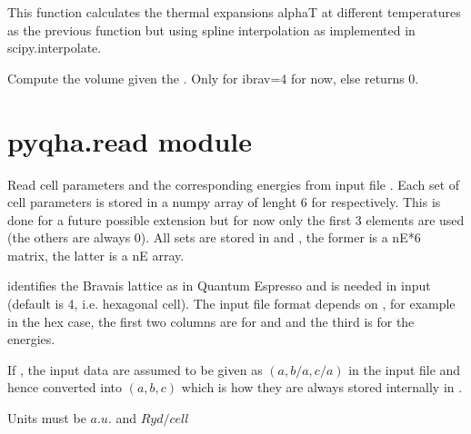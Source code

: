 \documentclass[letterpaper,10pt,english]{sphinxmanual}
\begin{document}

\begin{fulllineitems}
\label{pyqha:pyqha.properties_anis.compute_alpha_splines}
This function calculates the thermal expansions alphaT at different temperatures
as the previous function but using spline interpolation as implemented in
scipy.interpolate.

\end{fulllineitems}


\begin{fulllineitems}
\label{pyqha:pyqha.properties_anis.compute_volume}
Compute the volume given the . Only for ibrav=4 for now, else 
returns 0.

\end{fulllineitems}



\section{pyqha.read module}
\label{pyqha:pyqha-read-module}\label{pyqha:module-pyqha.read}

\begin{fulllineitems}
\label{pyqha:pyqha.read.read_Etot}
Read cell parameters  and the corresponding energies from input file . 
Each set of cell parameters is stored in a numpy array of lenght 6 
for  respectively. This is done for a future possible 
extension but for now only the first 3 elements are used (the others are always 0).
All sets are stored in  and , the former is a nE*6 matrix, 
the latter is a nE array.

 identifies the Bravais lattice as in Quantum Espresso and is needed 
in input (default is 4, i.e. hexagonal cell). The input file format depends
on , for example in the hex case, the first two columns are for  and
 and the third is for the energies.

If , the input data are assumed to be given as 
\((a,b/a,c/a)\) in the input file and hence converted into \((a,b,c)\)
which is how they are always stored internally in .

Units must be \(a.u.\) and \(Ryd/cell\)

\end{fulllineitems}
\end{document}
